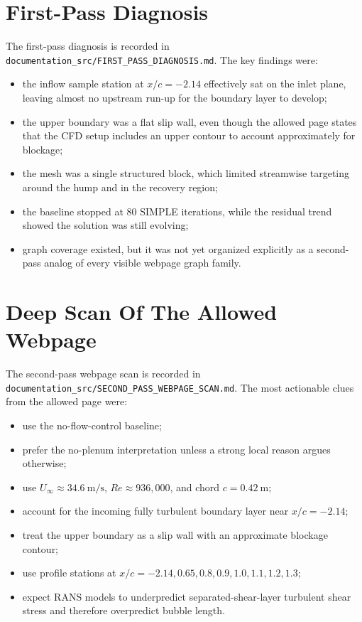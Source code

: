 \documentclass[11pt]{article}
\begin{document}
\section{First-Pass Diagnosis}
The first-pass diagnosis is recorded in \texttt{documentation\_src/FIRST\_PASS\_DIAGNOSIS.md}. The key findings were:
\begin{itemize}
\item the inflow sample station at \(x/c=-2.14\) effectively sat on the inlet plane, leaving almost no upstream run-up for the boundary layer to develop;
\item the upper boundary was a flat slip wall, even though the allowed page states that the CFD setup includes an upper contour to account approximately for blockage;
\item the mesh was a single structured block, which limited streamwise targeting around the hump and in the recovery region;
\item the baseline stopped at 80 SIMPLE iterations, while the residual trend showed the solution was still evolving;
\item graph coverage existed, but it was not yet organized explicitly as a second-pass analog of every visible webpage graph family.
\end{itemize}

\section{Deep Scan Of The Allowed Webpage}
The second-pass webpage scan is recorded in \texttt{documentation\_src/SECOND\_PASS\_WEBPAGE\_SCAN.md}. The most actionable clues from the allowed page were:
\begin{itemize}
\item use the no-flow-control baseline;
\item prefer the no-plenum interpretation unless a strong local reason argues otherwise;
\item use \(U_\infty \approx 34.6~\mathrm{m/s}\), \(Re \approx 936{,}000\), and chord \(c = 0.42~\mathrm{m}\);
\item account for the incoming fully turbulent boundary layer near \(x/c = -2.14\);
\item treat the upper boundary as a slip wall with an approximate blockage contour;
\item use profile stations at \(x/c = -2.14, 0.65, 0.8, 0.9, 1.0, 1.1, 1.2, 1.3\);
\item expect RANS models to underpredict separated-shear-layer turbulent shear stress and therefore overpredict bubble length.
\end{itemize}
\end{document}
